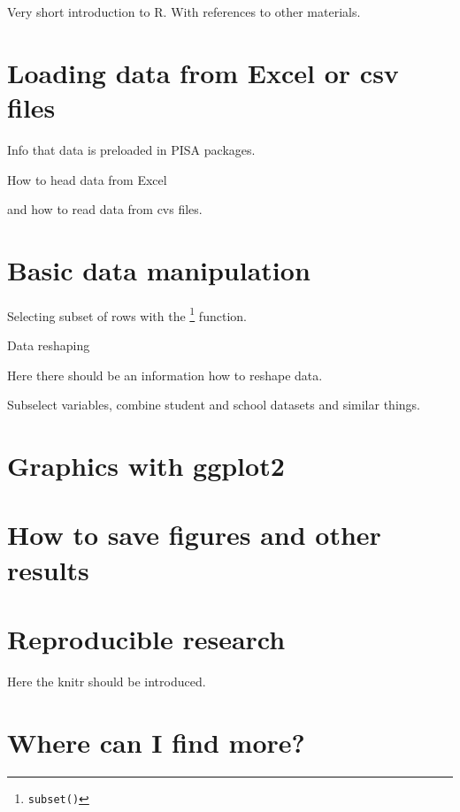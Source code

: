 Very short introduction to R. With references to other materials.

\section{Loading data from Excel or csv files}
Info that data is preloaded in PISA packages.

How to head data from Excel

and how to read data from cvs files.


\section{Basic data manipulation}

Selecting subset of rows with the \footnote{\texttt{subset()}} function. 

{Data reshaping}

Here there should be an information how to reshape data.

Subselect variables, combine student and school datasets and similar things.


\section{Graphics with ggplot2}


\section{How to save figures and other results}


\section{Reproducible research}
Here the knitr should be introduced.



\section{Where can I find more?}


